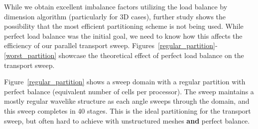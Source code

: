 \documentclass[letterpaper]{mandc2019}
\begin{document}
While we obtain excellent imbalance factors utilizing the load balance by dimension algorithm (particularly for 3D cases), further study shows the possibility that the most efficient partitioning scheme is not being used. 
While perfect load balance was the initial goal, we need to know how this affects the efficiency of our parallel transport sweep. Figures~\ref{regular_partition}-\ref{worst_partition} showcase the theoretical effect of perfect load balance on the transport sweep.

Figure~\ref{regular_partition} shows a sweep domain with a regular partition with perfect balance (equivalent number of cells per processor). The sweep maintains a mostly regular wavelike structure as each angle sweeps through the domain, and this sweep completes in 40 stages. This is the ideal partitioning for the transport sweep, but often hard to achieve with unstructured meshes \textbf{and} perfect balance.
\end{document}
